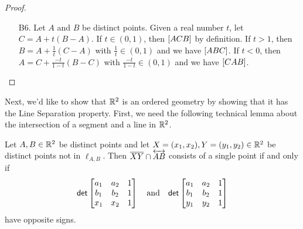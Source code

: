 \begin{proof}
\begin{itemize}
\item[B6.] Let \(A\) and \(B\) be distinct points.
Given a real number \(t\), let \(C = A + t(B-A)\).
If \(t \in (0,1)\), then \([ A C B ]\) by definition.
If \(t > 1\), then \(B = A + \frac{1}{t}(C-A)\) with \(\frac{1}{t} \in (0,1)\) and we have \([ A B C ]\).
If \(t < 0\), then \(A = C + \frac{-t}{1-t}(B-C)\) with \(\frac{-t}{1-t} \in (0,1)\) and we have \([ C A B ]\).
\qedhere
\end{itemize}
\end{proof}

Next, we'd like to show that \(\mathbb{R}^2\) is an ordered geometry by showing that it has the Line Separation property.
First, we need the following technical lemma about the intersection of a segment and a line in \(\mathbb{R}^2\).

\begin{lem}
Let \(A,B \in \mathbb{R}^2\) be distinct points and let \(X = (x_1, x_2), Y = (y_1, y_2) \in \mathbb{R}^2\) be distinct points not in \(\ell_{A,B}\).
Then \(\overline{XY} \cap \overleftrightarrow{AB}\) consists of a single point if and only if \[ \mathsf{det} \begin{bmatrix} a_1 & a_2 & 1 \\ b_1 & b_2 & 1 \\ x_1 & x_2 & 1 \end{bmatrix} \quad \mathrm{and} \quad \mathsf{det} \begin{bmatrix} a_1 & a_2 & 1 \\ b_1 & b_2 & 1 \\ y_1 & y_2 & 1 \end{bmatrix} \] have opposite signs.
\end{lem}

